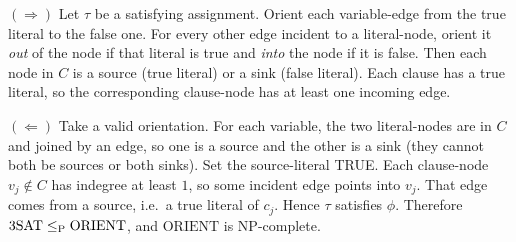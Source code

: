 \begin{soln}
\textbf{$(\Rightarrow)$} Let $\tau$ be a satisfying assignment. Orient each variable-edge from the true literal to the false one. For every other edge incident to a literal-node, orient it \emph{out} of the node if that literal is true and \emph{into} the node if it is false. Then each node in $C$ is a source (true literal) or a sink (false literal). Each clause has a true literal, so the corresponding clause-node has at least one incoming edge.

\enlargethispage{3\baselineskip}\textbf{$(\Leftarrow)$} Take a valid orientation. For each variable, the two literal-nodes are in $C$ and joined by an edge, so one is a source and the other is a sink (they cannot both be sources or both sinks). Set the source-literal TRUE. Each clause-node $v_j\notin C$ has indegree at least $1$, so some incident edge points into $v_j$. That edge comes from a source, i.e.\ a true literal of $c_j$. Hence $\tau$ satisfies $\phi$. Therefore $\mathrm{3SAT}\le_{\mathrm{P}}\mathrm{ORIENT}$, and $\mathrm{ORIENT}$ is NP-complete.
\end{soln}
